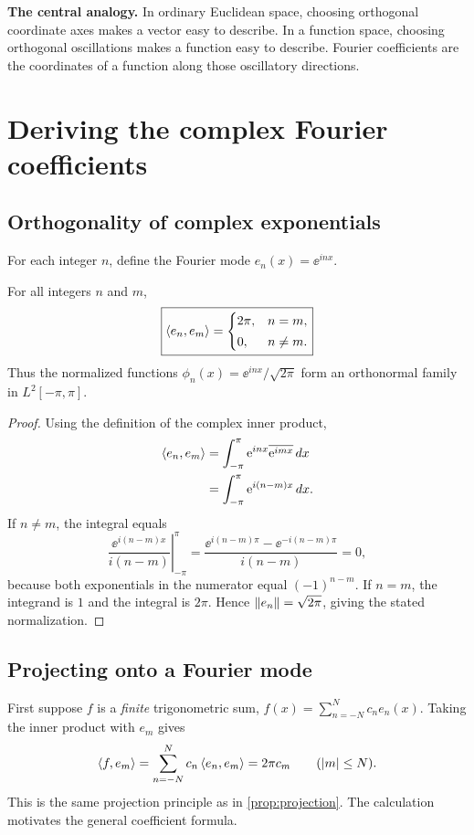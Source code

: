 \begin{remark}
\textbf{The central analogy.} In ordinary Euclidean space, choosing orthogonal
coordinate axes makes a vector easy to describe. In a function space, choosing
orthogonal oscillations makes a function easy to describe. Fourier coefficients
are the coordinates of a function along those oscillatory directions.
\end{remark}

\section{Deriving the complex Fourier coefficients}
\subsection{Orthogonality of complex exponentials}
For each integer $n$, define the Fourier mode $e_n(x)=\ee^{inx}$.

\begin{lemma}\label{lem:orthogonality}
For all integers $n$ and $m$,
\begin{equation}\label{eq:orthogonality}
 \boxed{\left\langle e_n,e_m\right\rangle=\begin{cases}
 2\pi,&n=m,\\[2pt]0,&n\neq m.
 \end{cases}}
\end{equation}
Thus the normalized functions $\phi_n(x)=\ee^{inx}/\sqrt{2\pi}$
form an orthonormal family in $L^2[-\pi,\pi]$.
\end{lemma}
\begin{proof}
Using the definition of the complex inner product,
\begin{align*}
 \left\langle e_n,e_m\right\rangle
 &=\int_{-\pi}^{\pi}\mathrm{e}^{inx}\overline{\mathrm{e}^{imx}}\,dx\\
 &=\int_{-\pi}^{\pi}\mathrm{e}^{i(n-m)x}\,dx.
\end{align*}
If $n\neq m$, the integral equals
\[
 \left.\frac{\ee^{i(n-m)x}}{i(n-m)}\right|_{-\pi}^{\pi}
 =\frac{\ee^{i(n-m)\pi}-\ee^{-i(n-m)\pi}}{i(n-m)}=0,
\]
because both exponentials in the numerator equal $(-1)^{n-m}$.
If $n=m$, the integrand is $1$ and the integral is $2\pi$.
Hence $\left\lVert e_n\right\rVert=\sqrt{2\pi}$, giving the stated normalization.
\end{proof}

\subsection{Projecting onto a Fourier mode}
First suppose $f$ is a \emph{finite} trigonometric sum,
$f(x)=\sum_{n=-N}^{N}c_ne_n(x)$. Taking the inner product with $e_m$ gives
\[
 \left\langle f,e_m\right\rangle
 =\sum_{n=-N}^{N}c_n\left\langle e_n,e_m\right\rangle
 =2\pi c_m \qquad (|m|\leq N).
\]
This is the same projection principle as in \cref{prop:projection}.
The calculation motivates the general coefficient formula.


